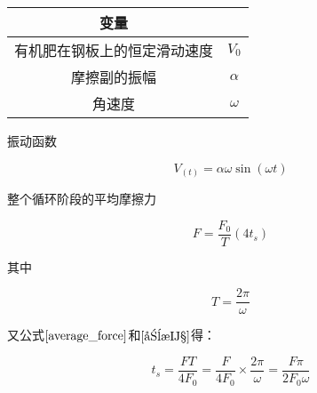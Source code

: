 \documentclass[a4paper,12pt,fontset=none,titlepage]{ctexart}
\begin{document}
\begin{table}[!h]
	\centering
	\begin{tabular}{cc}
		\toprule
		变量 & \\
		\midrule
		有机肥在钢板上的恒定滑动速度 & $V_0$ \\
		摩擦副的振幅 & $\alpha$ \\
		角速度 & $\omega$ \\
		\bottomrule
	\end{tabular}
\end{table}

振动函数

\[V_{(t)}=\alpha \omega \sin ( \omega t) \tag{2-1}\label{振动函数}\]

整个循环阶段的平均摩擦力

\[F = \frac{F_0}{T}(4t_s) \tag{2-2}\label{average_force}\]

其中

\[T=\frac{2\pi}{\omega} \tag{2-3}\label{周期}\]

又公式$\eqref{average_force}$和$\eqref{周期}$得：

\[t_s=\frac{FT}{4F_0}=\frac{F}{4F_0}\times\frac{2\pi}{\omega}=\frac{F\pi}{2F_0\omega} \tag{2-4}\]
\end{document}
